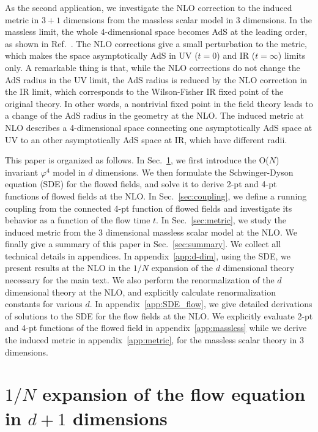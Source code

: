 \documentclass[preprint]{ptephy_v1}%
\begin{document}
As the second application, we investigate the NLO correction to the induced metric in $3+1$ dimensions  from the massless scalar model in 3 dimensions.
In the massless limit, the whole 4-dimensional space becomes AdS at the leading order, as shown in Ref.~\cite{Aoki:2016ohw}. The NLO corrections give  a small perturbation to the metric, which makes the space asymptotically AdS in UV ($t=0$) and IR ($t=\infty$) limits only. A  remarkable thing is that, while the NLO corrections do not change
the AdS radius in the UV limit, the AdS radius is  reduced by the NLO correction in the IR limit, which corresponds to the Wilson-Fisher IR fixed point of the original theory. In other words, a nontrivial fixed point in the field theory  leads to   a change of the AdS radius  in the geometry at the NLO.
The induced metric at NLO describes a 4-dimensional space connecting one asymptotically AdS space at UV to an other  asymptotically AdS space at IR, which have different radii. 

This paper is organized as follows. 
In Sec.~\ref{sec:flow}, we first introduce the  O($N$) invariant $\varphi^4$ model in $d$ dimensions. We then formulate  the Schwinger-Dyson equation (SDE) for the flowed fields, and solve it 
to derive 2-pt and 4-pt functions of flowed fields at the NLO.
In Sec.~\ref{sec:coupling}, we define  a running  coupling  from the connected 4-pt function of flowed fields  and investigate its behavior as a function of the flow time $t$.
In Sec.~\ref{sec:metric}, we study the induced metric from the 3 dimensional massless scalar model at the NLO.
We finally give a summary of this paper in Sec.~\ref{sec:summary}.
We collect all technical details in appendices. 
In appendix~\ref{app:d-dim}, using the SDE,
we present results at the NLO in the $1/N$ expansion of the $d$ dimensional theory necessary for the main text.
We also perform the renormalization  of the $d$ dimensional theory at the NLO, and 
explicitly calculate renormalization constants for various $d$.
In appendix~\ref{app:SDE_flow}, we give detailed  derivations of solutions to the SDE for the flow fields at the NLO.
We explicitly evaluate 2-pt and 4-pt functions of the flowed  field in appendix~\ref{app:massless} while we
derive the induced metric in appendix~\ref{app:metric}, for the massless scalar theory in 3 dimensions.


\section{$1/N$ expansion of the flow equation in $d+1$ dimensions}
\label{sec:flow}
\end{document}

